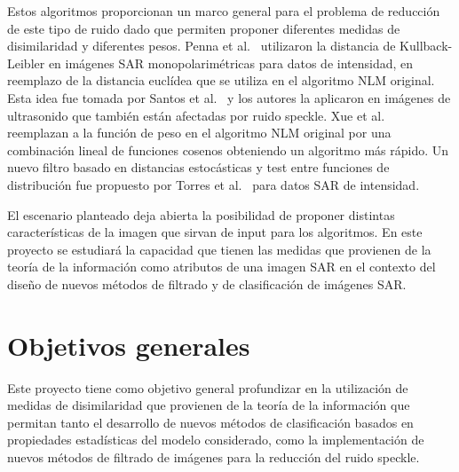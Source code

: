 \documentclass[11pt]{article}
\begin{document}
Estos algoritmos proporcionan un marco general para el problema de reducción de este tipo de ruido dado que permiten proponer diferentes medidas de disimilaridad y diferentes pesos. 
Penna et al.~\cite{Penna2013} utilizaron la distancia de Kullback-Leibler en imágenes SAR monopolarimétricas para datos de intensidad, en reemplazo de la distancia euclídea que se utiliza en el algoritmo NLM original. 
Esta idea fue tomada por Santos et al.~\cite{Santos2017} y los autores la aplicaron en imágenes de ultrasonido que también están afectadas por ruido speckle. 
Xue et al.~\cite{Xue2013} reemplazan a la función de peso en el algoritmo NLM original por una combinación lineal de funciones cosenos obteniendo un algoritmo más rápido. 
Un nuevo filtro basado en distancias estocásticas y test entre funciones de distribución fue propuesto por Torres et al.~\cite{Torres2012} para datos SAR de intensidad.

El escenario planteado deja abierta la posibilidad de proponer distintas características de la imagen que sirvan de input para los algoritmos. En este proyecto se estudiará la capacidad que tienen las medidas que provienen de la teoría de la información como atributos de una imagen SAR en el contexto del diseño de nuevos métodos de filtrado y de clasificación de imágenes SAR.



\section{Objetivos generales}



Este proyecto tiene como objetivo general profundizar en la utilización de medidas de disimilaridad que provienen de la teoría de la información que permitan tanto el desarrollo de nuevos métodos de clasificación basados en propiedades estadísticas del modelo considerado, como la implementación de nuevos métodos de filtrado de imágenes para la reducción del ruido speckle.
\end{document}

